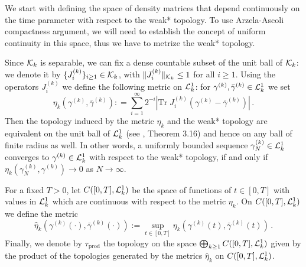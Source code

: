 \documentclass[11pt]{article}
\newcommand{\tr}{\mbox{Tr}}
\newcommand{\wh}{\widehat}
\newcommand{\cK}{{\cal K}}
\newcommand{\cL}{{\cal L}}
\begin{document}
\medskip


We start with defining the space of  density matrices
that depend continuously on the time parameter with respect to the
weak* topology. To use Arzela-Ascoli compactness argument, we will need
to establish the concept of uniform continuity in this space,
thus we have to metrize the weak* topology.

Since $\cK_k$ is separable, we can fix a dense countable subset of
the unit ball of $\cK_k$: we denote it by $\{J^{(k)}_i\}_{i \ge 1}
\in \cK_k$, with $\| J^{(k)}_i \|_{\cK_k} \leq 1$ for all $i \ge 1$.
Using the operators $J^{(k)}_i$ we define the following metric on
$\cL^1_k$: for $\gamma^{(k)}, \bar \gamma^{(k)} \in \cL^1_k$ we set
\begin{equation}\label{eq:etak}
\eta_k (\gamma^{(k)}, \bar \gamma^{(k)}) : = \sum_{i=1}^\infty
2^{-i} \left| \tr \; J^{(k)}_i \left( \gamma^{(k)} - \bar
\gamma^{(k)} \right) \right| \, .
\end{equation}
Then the topology induced by the metric $\eta_k$ and
the weak* topology are equivalent on the unit ball of $\cL^1_k$
 (see \cite{Ru}, Theorem 3.16) and hence on
any ball of finite radius as well. In other words, a uniformly
bounded sequence $\gamma_N^{(k)} \in \cL^1_k$ converges to
$\gamma^{(k)} \in \cL^1_k$ with respect to the weak* topology, if
and only if $\eta_k (\gamma^{(k)}_N , \gamma^{(k)}) \to 0$ as $N \to
\infty$.

For a fixed $T > 0$, let $C ([0,T], \cL^1_k)$ be the space of
functions of $t \in [0,T]$ with values in $\cL^1_k$ which are
continuous with respect to the metric $\eta_k$. On $C ([0,T],
\cL^1_k)$ we define the metric
\begin{equation}\label{eq:whetak}
\widehat \eta_k (\gamma^{(k)} (\cdot ) , \bar \gamma^{(k)} (\cdot ))
:= \sup_{t \in [0,T]} \eta_k (\gamma^{(k)} (t) , \bar \gamma^{(k)}
(t))\,.
\end{equation}
Finally, we denote by $\tau_{\text{prod}}$ the topology on the
space $\bigoplus_{k \geq 1} C([0,T], \cL^1_k)$ given by the product
of the topologies generated by the metrics $\wh \eta_k$ on $C([0,T],
\cL^1_k)$.
\end{document}

